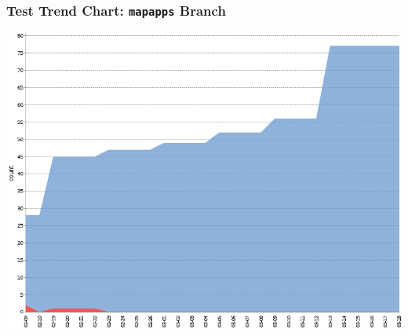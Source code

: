 
\begin{frame}[plain]
\frametitle{Test Trend Chart: \texttt{mapapps} Branch}
\plainnumber
\begin{center}
\includegraphics[width=1\textwidth] {images/test-trend-chart-md2-framework.png}
\end{center}
\end{frame}






